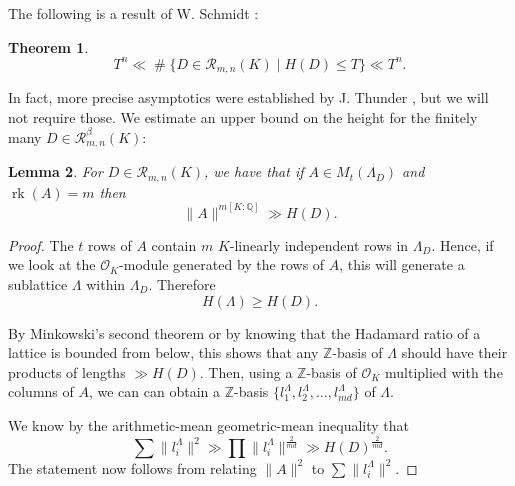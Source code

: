 \documentclass{amsart}
\newtheorem{theorem}{Theorem}
\newtheorem{lemma}[theorem]{Lemma}
\newcommand{\OK}{\mathcal{O}_K}
\DeclareMathOperator{\card}{\texttt{\#}}
\DeclareMathOperator{\rank}{rk}
\begin{document}
The following is a result of W. Schmidt \cite{S1967}:
\begin{theorem}
\label{th:schmidt}
\begin{equation}
	T^{n} \ll \card \{ D \in \mathcal{R}_{m,n}(K) \mid H(D) \leq T \} \ll T^{n}.
\end{equation}
\end{theorem}
In fact, more precise asymptotics were established by J. Thunder \cite{T1993}, but we will not require those.
We estimate an upper bound on the height for the finitely many $D\in\mathcal{R}_{m,n}^{\beta}(K)$:
\begin{lemma}
\label{le:lower_bound_on_C}
For $D \in \mathcal{R}_{m,n}(K)$, 
we have that if $A \in M_{t}(\Lambda_D)$ 
and $\rank (A) = m$
then
\begin{equation}
	\|A \|^{m[K:\mathbb{Q}]} \gg H(D).
\end{equation}
\end{lemma}
\begin{proof}
The $t$ rows of $A$ contain $m$ $K$-linearly independent rows in $\Lambda_D$. 
Hence, if we look at the $\OK$-module generated by the rows of $A$, this will generate
a sublattice $\Lambda$ within $\Lambda_D$. Therefore 
\begin{equation}
	H(\Lambda) \geq H(D).
\end{equation}

By Minkowski's second theorem or by knowing that the Hadamard ratio of a lattice is bounded from below, this shows that any $\mathbb{Z}$-basis of $\Lambda$ should have their products of lengths $\gg H(D)$.
Then, using a $\mathbb{Z}$-basis of $\OK$ multiplied with the columns of $A$, we can can obtain a $\mathbb{Z}$-basis
$\{l_1^{\Lambda},l_2^{\Lambda},\dots,l_{md}^{\Lambda}\}$ of $\Lambda$. 

We know by the arithmetic-mean geometric-mean inequality that 
\begin{equation}
  \sum  \| l_i^{\Lambda}\|^{2} \gg \prod \|l_i^{\Lambda}\|^{\frac{2}{md}} \gg H(D)^{\frac{2}{md}}.
\end{equation}
The statement now follows 
from relating $\|A\|^{2}$ to $\sum \|l_{i}^{\Lambda}\|^{2}$.
\end{proof}
\end{document}

